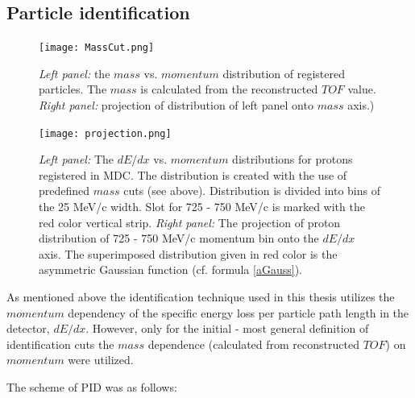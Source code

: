 \subsection{\label{PID} Particle identification}
\begin{figure}[!ht]
		\centering
		\texttt{[image: MassCut.png]}
		\caption{{\it Left panel:} the $mass$ vs. $momentum$  distribution of registered particles. The $mass$ is calculated from the reconstructed $TOF$ value. 
		{\it Right panel:} projection of distribution of left panel onto $mass$ axis.) }
		\label{MassCuts}
	\end{figure}
	\begin{figure}[!ht]
		\centering
		\texttt{[image: projection.png]}
		\caption{{\it Left panel:} The $dE/dx$ vs. $momentum$  distributions for protons registered in MDC. The distribution is created with the use of predefined
		$mass$ cuts (see above). Distribution is divided into bins of the 25 MeV/c width. Slot for 725 - 750 MeV/c is marked with the red color vertical strip.
		{\it Right panel:} The projection of proton distribution of 725 - 750 MeV/c momentum bin onto the $dE/dx$ axis. The superimposed distribution given 
		in red color is the asymmetric Gaussian function (cf. formula \ref{aGauss}). 
		}
		\label{Projec}
	\end{figure}
As mentioned above the identification technique used in this thesis utilizes the $momentum$ dependency of the specific energy loss 
per particle path length in the detector, $dE/dx$.
However, only for the initial - most general definition of identification cuts the 
$mass$ dependence (calculated from reconstructed $TOF$) on $momentum$ were utilized.

The scheme of PID was as follows:

